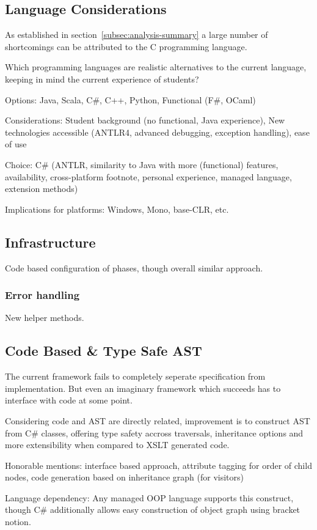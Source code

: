 \documentclass[final,a4paper,12pt]{article}
\begin{document}
\subsection{Language Considerations}
As established in section~\ref{subsec:analysis-summary} a large number of shortcomings can be attributed to the C programming language. 

Which programming languages are realistic alternatives to the current language, keeping in mind the current experience of students?

Options: Java, Scala, C\#, C++, Python, Functional (F\#, OCaml)

Considerations: Student background (no functional, Java experience), New technologies accessible (ANTLR4, advanced debugging, exception handling), ease of use

Choice: C\# (ANTLR, similarity to Java with more (functional) features, availability, cross-platform footnote, personal experience, managed language, extension methods)

Implications for platforms: Windows, Mono, base-CLR, etc.
\subsection{Infrastructure}
Code based configuration of phases, though overall similar approach.
\subsubsection{Error handling}
New helper methods.
\subsection{Code Based \& Type Safe AST}
The current framework fails to completely seperate specification from implementation. But even an imaginary framework which succeeds has to interface with code at some point. 

Considering code and AST are directly related, improvement is to construct AST from C\# classes, offering type safety accross traversals, inheritance options and more extensibility when compared to XSLT generated code.

Honorable mentions: interface based approach, attribute tagging for order of child nodes, code generation based on inheritance graph (for visitors)

Language dependency: Any managed OOP language supports this construct, though C\# additionally allows easy construction of object graph using bracket notion.
\end{document}
